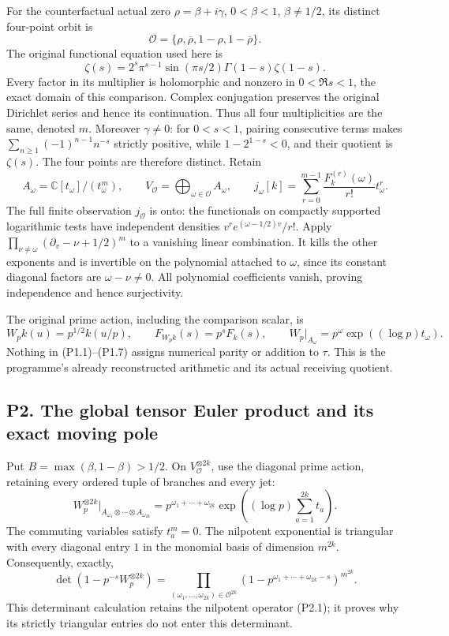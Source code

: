 For the counterfactual actual zero \(\rho=\beta+i\gamma\),
\(0<\beta<1\), \(\beta\ne1/2\), its distinct four-point orbit is \[
\mathcal O=\{\rho,\overline\rho,1-\rho,1-\overline\rho\}.
\] The original functional equation used here is \[
\zeta(s)=2^s\pi^{s-1}\sin(\pi s/2)\Gamma(1-s)\zeta(1-s).
\tag{P1.5a}
\] Every factor in its multiplier is holomorphic and nonzero in
\(0<\Re s<1\), the exact domain of this comparison. Complex conjugation
preserves the original Dirichlet series and hence its continuation. Thus
all four multiplicities are the same, denoted \(m\). Moreover
\(\gamma\ne0\): for \(0<s<1\), pairing consecutive terms makes
\(\sum_{n\ge1}(-1)^{n-1}n^{-s}\) strictly positive, while
\(1-2^{1-s}<0\), and their quotient is \(\zeta(s)\). The four points are
therefore distinct. Retain \[
A_\omega=\mathbb C[t_\omega]/(t_\omega^m),\qquad
V_{\mathcal O}=\bigoplus_{\omega\in\mathcal O}A_\omega,\qquad
j_\omega[k]=\sum_{r=0}^{m-1}\frac{F_k^{(r)}(\omega)}{r!}t_\omega^r.
\tag{P1.6}
\] The full finite observation \(j_{\mathcal O}\) is onto: the
functionals on compactly supported logarithmic tests have independent
densities \(v^re^{(\omega-1/2)v}/r!\). Apply
\(\prod_{\nu\ne\omega}(\partial_v-\nu+1/2)^m\) to a vanishing linear
combination. It kills the other exponents and is invertible on the
polynomial attached to \(\omega\), since its constant diagonal factors
are \(\omega-\nu\ne0\). All polynomial coefficients vanish, proving
independence and hence surjectivity.

The original prime action, including the comparison scalar, is \[
W_pk(u)=p^{1/2}k(u/p),\qquad
F_{W_pk}(s)=p^sF_k(s),
\qquad
W_p|_{A_\omega}=p^\omega\exp((\log p)t_\omega).
\tag{P1.7}
\] Nothing in (P1.1)--(P1.7) assigns numerical parity or addition to
\(\tau\). This is the programme's already reconstructed arithmetic and
its actual receiving quotient.

\subsection{P2. The global tensor Euler product and its exact moving
pole}\label{p2.-the-global-tensor-euler-product-and-its-exact-moving-pole}

Put \(B=\max(\beta,1-\beta)>1/2\). On \(V_{\mathcal O}^{\otimes2k}\),
use the diagonal prime action, retaining every ordered tuple of branches
and every jet: \[
W_p^{\otimes2k}\big|_{A_{\omega_1}\otimes\cdots\otimes A_{\omega_{2k}}}
=p^{\omega_1+\cdots+\omega_{2k}}
\exp\!\left((\log p)\sum_{a=1}^{2k}t_a\right).
\tag{P2.1}
\] The commuting variables satisfy \(t_a^m=0\). The nilpotent
exponential is triangular with every diagonal entry \(1\) in the
monomial basis of dimension \(m^{2k}\). Consequently, exactly, \[
\det(1-p^{-s}W_p^{\otimes2k})
=
\prod_{(\omega_1,\ldots,\omega_{2k})\in\mathcal O^{2k}}
\left(1-p^{\omega_1+\cdots+\omega_{2k}-s}\right)^{m^{2k}}.
\tag{P2.2}
\] This determinant calculation retains the nilpotent operator (P2.1);
it proves why its strictly triangular entries do not enter this
determinant.

